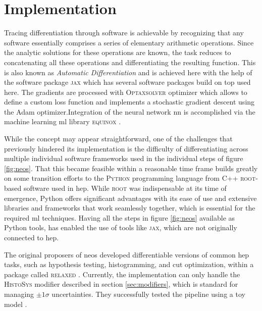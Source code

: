 \section{Implementation}
Tracing differentiation through software is achievable by recognizing that any software essentially comprises a series of elementary arithmetic operations. Since the analytic solutions for these operations are known, the task reduces to concatenating all these operations and differentiating the resulting function. This is also known as \textit{Automatic Differentiation} and is achieved here with the help of the software package \textsc{jax} \citep{jax2018github} which has several software packages build on top used here. The gradients are processed with \textsc{Optaxsolver} optimizer \citep{jaxopt_implicit_diff} which allows to define a custom loss function and implements a stochastic gradient descent using the Adam optimizer.Integration of the neural network \ac{nn} is accomplished via the machine learning \ac{ml} library \textsc{equinox} \citep{kidger2021equinox}.

While the concept may appear straightforward, one of the challenges that previously hindered its implementation is the difficulty of differentiating across multiple individual software frameworks used in the individual steps of figure \ref{fig:neos}. That this became feasible within a reasonable time frame builds greatly on some transition efforts to the \textsc{Python} programming language from C++ \textsc{root}-based software \citep{ANTCHEVA20092499} used in \ac{hep}. While \textsc{root} was indispensable at its time of emergence, Python offers significant advantages with its ease of use and extensive libraries and frameworks that work seamlessly together, which is essential for the required \ac{ml} techniques. Having all the steps in figure \ref{fig:neos} available as Python tools, has enabled the use of tools like \textsc{jax}, which are not originally connected to \ac{hep}.

The original proposers \citet{Simpson_2023} of \ac{neos} developed differentiable versions of common \ac{hep} tasks, such as hypothesis testing, histogramming, and cut optimization, within a package called \textsc{relaxed} \citep{Simpson_relaxed_version_0_3_0_2023}. Currently, the implementation can only handle the \textsc{HistoSys} modifier described in section \ref{sec:modifiers}, which is standard for managing $\pm1\sigma$ uncertainties. They successfully tested the pipeline using a toy model \citep{Simpson_neos_version_0_2_0_2021}.

